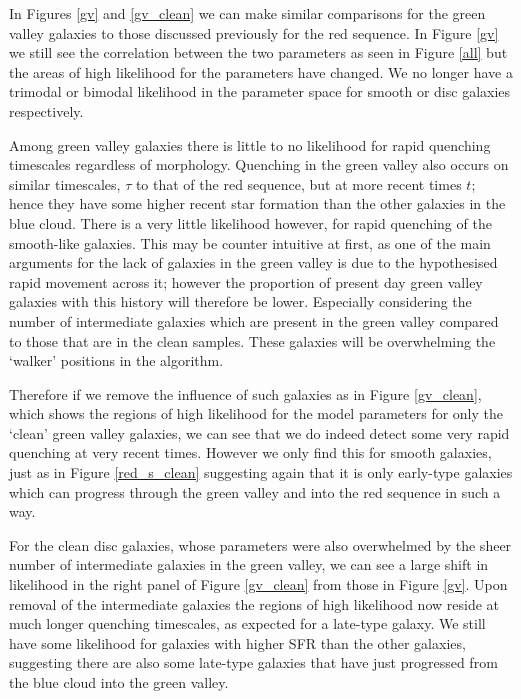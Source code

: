\documentclass[useAMS,usenatbib]{mn2e}
\begin{document}
In Figures \ref{gv} and \ref{gv_clean} we can make similar comparisons for the green valley galaxies to those discussed previously for the red sequence. In Figure \ref{gv} we still see the correlation between the two parameters as seen in Figure \ref{all} but the areas of high likelihood for the parameters have changed. We no longer have a trimodal or bimodal likelihood in the parameter space for smooth or disc galaxies respectively. 

Among green valley galaxies there is little to no likelihood for rapid quenching timescales regardless of morphology. Quenching in the green valley also occurs on similar timescales, $\tau$ to that of the red sequence, but at more recent times $t$; hence they have some higher recent star formation than the other galaxies in the blue cloud. There is a very little likelihood however, for rapid quenching of the smooth-like galaxies. This may be counter intuitive at first, as one of the main arguments for the lack of galaxies in the green valley is due to the hypothesised rapid movement across it; however the proportion of present day green valley galaxies with this history will therefore be lower. Especially considering the number of intermediate galaxies which are present in the green valley compared to those that are in the clean samples. These galaxies will be overwhelming the `walker' positions in the algorithm. 

Therefore if we remove the influence of such galaxies as in Figure \ref{gv_clean}, which shows the regions of high likelihood for the model parameters for only the `clean' green valley galaxies, we can see that we do indeed detect some very rapid quenching at very recent times. However we only find this for smooth galaxies, just as in Figure \ref{red_s_clean} suggesting again that it is only early-type galaxies which can progress through the green valley and into the red sequence in such a way. 

For the clean disc galaxies, whose parameters were also overwhelmed by the sheer number of intermediate galaxies in the green valley, we can see a large shift in likelihood in the right panel of Figure \ref{gv_clean} from those in Figure \ref{gv}. Upon removal of the intermediate galaxies the regions of high likelihood now reside at much longer quenching timescales, as expected for a late-type galaxy.  We still have some likelihood for galaxies with higher SFR than the other galaxies, suggesting there are also some late-type galaxies that have just progressed from the blue cloud into the green valley. 
\end{document}
